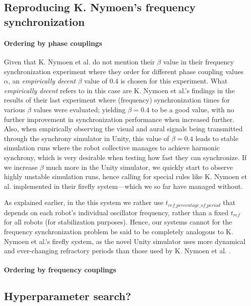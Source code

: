 	\subsection{Reproducing K. Nymoen's frequency synchronization}
	
	\paragraph{Ordering by phase couplings}
	Given that K. Nymoen et al. \cite{nymoen_synch} do not mention their $\beta$ value in their frequency synchronization experiment where they order for different phase coupling values $\alpha$, an \textit{empirically decent} $\beta$ value of 0.4 is chosen for this experiment. What \textit{empirically decent} refers to in this case are K. Nymoen et al.'s findings in the results of their last experiment where (frequency) synchronization times for various $\beta$ values were evaluated; yielding $\beta=0.4$ to be a good value, with no further improvement in synchronization performance when increased further. Also, when empirically observing the visual and aural signals being transmitted through the synchrony simulator in Unity, this value of $\beta=0.4$ leads to stable simulation runs where the robot collective manages to achieve harmonic synchrony, which is very desirable when testing how fast they can synchronize. If we increase $\beta$ much more in the Unity simulator, we quickly start to observe highly unstable simulation runs, hence calling for special rules like K. Nymoen et al. implemented in their firefly system—which we so far have managed without.
	
	
	As explained earlier, in the this system we rather use $t_{ref\_percentage\_of\_period}$ that depends on each robot's individual oscillator frequency, rather than a fixed $t_{ref}$ for all robots (for stabilization purposes). Hence, our systems cannot for the frequency synchronization problem be said to be completely analogous to K. Nymoen et al.'s firefly system, as the novel Unity simulator uses more dynamical and ever-changing refractory periods than those used by K. Nymoen et al. \cite{nymoen_synch}.
	
	\paragraph{Ordering by frequency couplings}
	
	\subsection{Hyperparameter search?}
